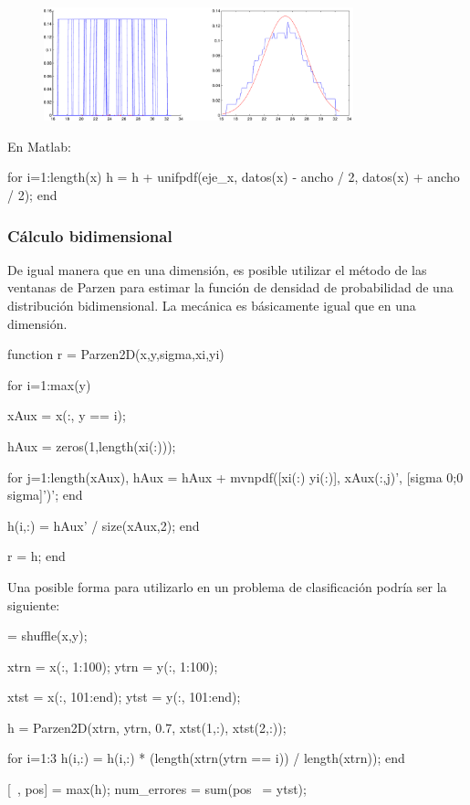 \documentclass[11pt]{scrartcl}
\begin{document}
\begin{figure}[h!]
  \centering
  \includegraphics[width=0.8\textwidth]{img/parzen_2}
\end{figure}

En Matlab:

\begin{matlabcode}
for i=1:length(x)
  h = h + unifpdf(eje_x, datos(x) - ancho / 2, datos(x) + ancho / 2);
end
\end{matlabcode}

\subsubsection{Cálculo bidimensional}

De igual manera que en una dimensión, es posible utilizar el método de las
ventanas de Parzen para estimar la función de densidad de probabilidad de una
distribución bidimensional. La mecánica es básicamente igual que en una
dimensión.

\begin{matlabcode}
function r = Parzen2D(x,y,sigma,xi,yi)

for i=1:max(y)
    
    xAux = x(:, y == i);
    
    hAux = zeros(1,length(xi(:)));
    
    for j=1:length(xAux),
        hAux = hAux + mvnpdf([xi(:) yi(:)], xAux(:,j)', [sigma 0;0 sigma]')';
    end
    
    h(i,:) = hAux' / size(xAux,2);    
end

r = h;
end  
\end{matlabcode}

Una posible forma para utilizarlo en un problema de clasificación podría ser la
siguiente:

\begin{matlabcode}
[x,y] = shuffle(x,y);
  
xtrn = x(:, 1:100);
ytrn = y(:, 1:100);

xtst = x(:, 101:end);
ytst = y(:, 101:end);
 
h = Parzen2D(xtrn, ytrn, 0.7, xtst(1,:), xtst(2,:));
  
for i=1:3
  h(i,:) = h(i,:) * (length(xtrn(ytrn == i)) / length(xtrn)); 
end

[~, pos] = max(h);
num_errores = sum(pos ~= ytst);
\end{matlabcode}
\end{document}
